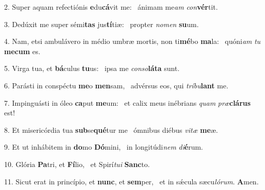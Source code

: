 2. Super aquam refectiónis \textbf{e}du\textbf{cá}vit me: \ast\  ánimam me\textit{am} \textit{con}\textbf{vér}tit.\

3. Dedúxit me super sémi\textbf{tas} jus\textbf{tí}tiæ: \ast\  propter \textit{no}\textit{men} \textbf{su}um.\

4. Nam, etsi ambulávero in médio umbræ mortis, non ti\textbf{mé}bo \textbf{ma}la: \ast\  quóni\textit{am} \textit{tu} \textbf{me}\textbf{cum} es.\

5. Virga tua, et \textbf{bá}culus \textbf{tu}us: \ast\  ipsa me \textit{con}\textit{so}\textbf{lá}\textbf{ta} sunt.\

6. Parásti in conspéctu \textbf{me}o \textbf{men}sam, \ast\  advérsus eos, qui \textit{trí}\textit{bu}\textbf{lant} me.\

7. Impinguásti in óleo \textbf{ca}put \textbf{me}um: \ast\  et calix meus inébrians \textit{quam} \textit{præ}\textbf{clá}\textbf{rus} est!\

8. Et misericórdia tua \textbf{sub}se\textbf{qué}tur me \ast\  ómnibus diébus \textit{vi}\textit{tæ} \textbf{me}æ.\

9. Et ut inhábitem in \textbf{do}mo \textbf{Dó}mini, \ast\  in longitúdi\textit{nem} \textit{di}\textbf{é}rum.\

10. Glória \textbf{Pa}tri, et \textbf{Fí}lio, \ast\  et Spirí\textit{tu}\textit{i} \textbf{Sanc}to.\

11. Sicut erat in princípio, et \textbf{nunc}, et \textbf{sem}per, \ast\  et in sǽcula sæcu\textit{ló}\textit{rum}. \textbf{A}men.\

